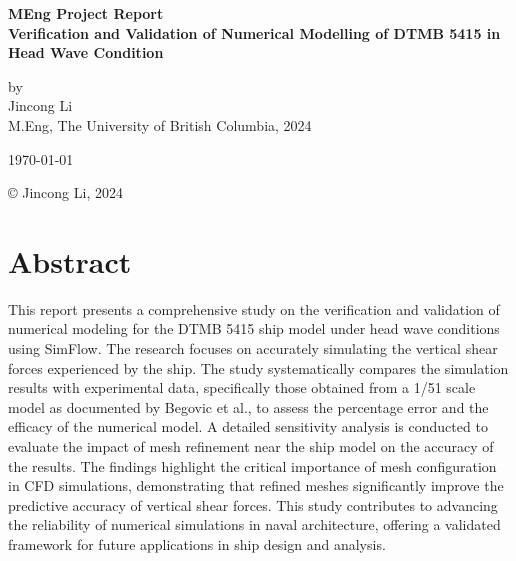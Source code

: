 \documentclass[12pt]{article} %
\begin{document}
\setlength{\parskip}{1em} 
\setlength{\parindent}{0pt}
\newcommand{\vect}[1]{\mathbf{#1}}

\begin{titlepage}  %
    \centering    %

    \vspace*{2cm}
    
    \normalsize \textbf{MEng Project Report} \\
    \vspace{0.5cm}  %
    \normalsize\textbf{Verification and Validation of Numerical Modelling of DTMB 5415 in Head Wave Condition} \\
    \vspace{2cm}  %
    
    \normalsize by\\
    \vspace{1cm}
    \normalsize Jincong Li \\ 
    \vspace{1cm}
    \normalsize M.Eng, The University of British Columbia, 2024
    \vspace{11cm}  %
    
    \normalsize \today

    \vfill  %
    © Jincong Li, 2024
\end{titlepage}
\tableofcontents
\newpage
\section{Abstract}
This report presents a comprehensive study on the verification and validation of numerical modeling 
for the DTMB 5415 ship model under head wave conditions using SimFlow. The research focuses on 
accurately simulating the vertical shear forces experienced by the ship. The study systematically 
compares the simulation results with experimental data, specifically those obtained from a 1/51 scale model 
as documented by Begovic et al., 
to assess the percentage error and the efficacy of the numerical model. A detailed sensitivity analysis 
is conducted to evaluate the impact of mesh refinement near the ship model on the accuracy of the results. 
The findings highlight the critical importance of mesh configuration in CFD simulations, demonstrating 
that refined meshes significantly improve the predictive accuracy of vertical shear forces. 
This study contributes to advancing the reliability of numerical simulations in naval architecture,
offering a validated framework for future applications in ship design and analysis.
\end{document}

